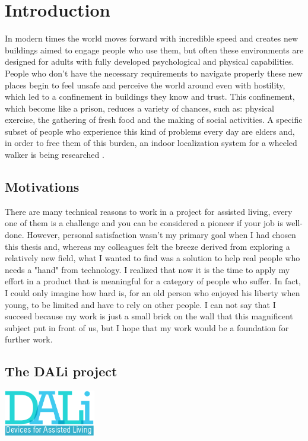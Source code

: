 \chapter{Introduction}
In modern times the world moves forward with incredible speed and creates new buildings aimed to engage people who use them, but often these environments are designed for adults with fully developed psychological and physical capabilities.
People who don't have the necessary requirements to navigate properly these new places begin to feel unsafe and perceive the world around even with hostility, which led to a confinement in buildings they know and trust.
This confinement, which become like a prison, reduces a variety of chances, such as: physical exercise, the gathering of fresh food and the making of social activities.
A specific subset of people who experience this kind of problems every day are elders and, in order to free them of this burden, an indoor localization system for a wheeled walker is being researched . 

\section{Motivations}

There are many technical reasons to work in a project for assisted living, every one of them is a challenge and you can be considered a pioneer if your job is well-done.
However, personal satisfaction wasn't my primary goal when I had chosen this thesis and, whereas my colleagues felt the breeze derived from exploring a relatively new field, what I wanted to find was a solution to help real people who needs a "hand" from technology.
I realized that now it is the time to apply my effort in a product that is meaningful for a category of people who suffer. 
In fact, I could only imagine how hard is, for an old person who enjoyed his liberty when young, to be limited and have to rely on other people.
I can not say that I succeed because my work is just a small brick on the wall that this magnificent subject put in front of us, but I hope that my work would be a foundation for further work.

\section{The DALi project}

\vspace{1cm}
\begin{center}
      \includegraphics[width=0.3\textwidth]{img/Dali-logo.png}
\end{center}
\vspace{1cm}

